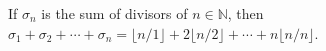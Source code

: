 If $\sigma_n$ is the sum of divisors of $n \in \mathbb{N}$, then $\sigma_1 + \sigma_2 + \cdots + \sigma_n = \lfloor n/1 \rfloor + 2\lfloor n/2 \rfloor + \cdots + n\lfloor n/n \rfloor$.
